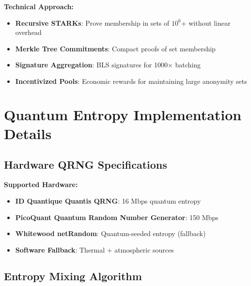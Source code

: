 \documentclass[12pt,a4paper]{article}
\begin{document}
\textbf{Technical Approach:}
\begin{itemize}
\item \textbf{Recursive STARKs}: Prove membership in sets of $10^6$+ without linear overhead
\item \textbf{Merkle Tree Commitments}: Compact proofs of set membership
\item \textbf{Signature Aggregation}: BLS signatures for 1000× batching
\item \textbf{Incentivized Pools}: Economic rewards for maintaining large anonymity sets
\end{itemize}

\section{Quantum Entropy Implementation Details}

\subsection{Hardware QRNG Specifications}

\textbf{Supported Hardware:}
\begin{itemize}
\item \textbf{ID Quantique Quantis QRNG}: 16 Mbps quantum entropy
\item \textbf{PicoQuant Quantum Random Number Generator}: 150 Mbps
\item \textbf{Whitewood netRandom}: Quantum-seeded entropy (fallback)
\item \textbf{Software Fallback}: Thermal + atmospheric sources
\end{itemize}

\subsection{Entropy Mixing Algorithm}
\end{document}
